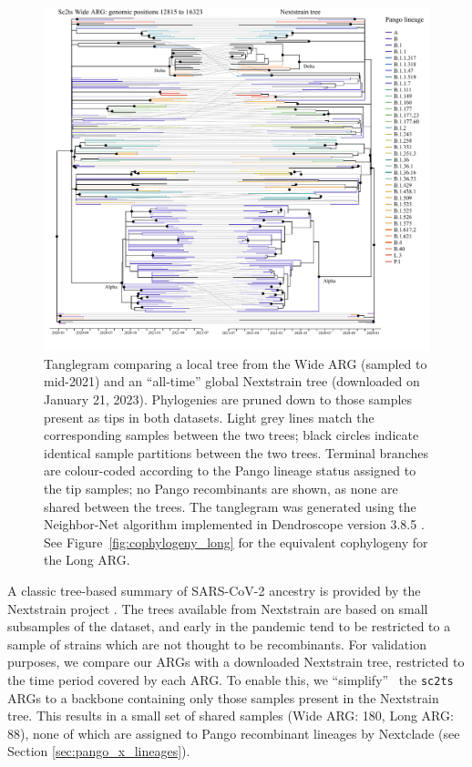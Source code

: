 \documentclass{article}
\begin{document}
\begin{figure} \centering
\includegraphics[width=\textwidth]{figures/cophylogeny_wide.pdf}
\caption{\label{fig:cophylogeny}
Tanglegram comparing a local tree from the Wide ARG
(sampled to mid-2021) and an ``all-time'' global Nextstrain tree
(downloaded on January 21, 2023).
Phylogenies are pruned down to those samples present as tips in both datasets. Light grey
lines match the corresponding samples between the two trees; black circles
indicate identical sample partitions between the two trees. Terminal branches
are colour-coded according to the Pango lineage status assigned to the tip
samples; no Pango recombinants are shown, as none are shared between the trees.
The tanglegram was generated using the Neighbor-Net algorithm
\citep{Scornavacca2011-mg} implemented in Dendroscope version 3.8.5
\citep{Huson2012-ys}. See Figure~\ref{fig:cophylogeny_long} for the equivalent
cophylogeny for the Long ARG.}
\end{figure}

A classic tree-based summary of SARS-CoV-2 ancestry is provided
by the Nextstrain project \citep{Hadfield2018-ef}. The trees
available from Nextstrain are based on small subsamples of the
dataset, and early in the pandemic tend to be restricted to
a sample of strains which are not thought to be recombinants.
For validation purposes, we compare our ARGs with
a downloaded Nextstrain tree, restricted to the time period
covered by each ARG. To enable this, we ``simplify''~\citep{Kelleher2018-xc}
the \texttt{sc2ts} ARGs to a backbone containing only those samples
present in the Nextstrain tree. This results in a small set of shared
samples (Wide ARG: 180, Long ARG: 88), none of which are
assigned to Pango recombinant lineages by Nextclade (see Section
\ref{sec:pango_x_lineages}).
\end{document}
